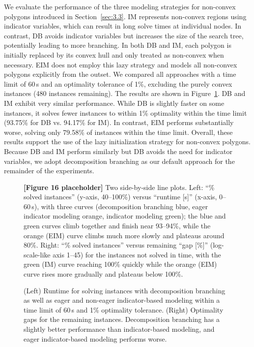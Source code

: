 \documentclass[11pt,a4paper]{article}
\theoremstyle{plain}
\begin{document}
We evaluate the performance of the three modeling strategies for non-convex polygons introduced in Section~\ref{sec:3.3}. IM represents non-convex regions using indicator variables, which can result in long solve times at individual nodes. In contrast, DB avoids indicator variables but increases the size of the search tree, potentially leading to more branching. In both DB and IM, each polygon is initially replaced by its convex hull and only treated as non-convex when necessary. EIM does not employ this lazy strategy and models all non-convex polygons explicitly from the outset. We compared all approaches with a time limit of 60\,s and an optimality tolerance of 1\%, excluding the purely convex instances (480 instances remaining). The results are shown in Figure~\ref{fig:16}. DB and IM exhibit very similar performance. While DB is slightly faster on some instances, it solves fewer instances to within 1\% optimality within the time limit (93.75\% for DB vs. 94.17\% for IM). In contrast, EIM performs substantially worse, solving only 79.58\% of instances within the time limit. Overall, these results support the use of the lazy initialization strategy for non-convex polygons. Because DB and IM perform similarly but DB avoids the need for indicator variables, we adopt decomposition branching as our default approach for the remainder of the experiments.

\begin{figure}[h]
\centering
\begin{figplaceholder}
\textbf{[Figure 16 placeholder]} Two side-by-side line plots. Left: ``\% solved instances'' (y-axis, 40--100\%) versus ``runtime [s]'' (x-axis, 0--60\,s), with three curves (decomposition branching blue, eager indicator modeling orange, indicator modeling green); the blue and green curves climb together and finish near 93--94\%, while the orange (EIM) curve climbs much more slowly and plateaus around 80\%. Right: ``\% solved instances'' versus remaining ``gap [\%]'' (log-scale-like axis 1--45) for the instances not solved in time, with the green (IM) curve reaching 100\% quickly while the orange (EIM) curve rises more gradually and plateaus below 100\%.
\end{figplaceholder}
\caption{(Left) Runtime for solving instances with decomposition branching as well as eager and non-eager indicator-based modeling within a time limit of 60\,s and 1\% optimality tolerance. (Right) Optimality gaps for the remaining instances. Decomposition branching has a slightly better performance than indicator-based modeling, and eager indicator-based modeling performs worse.}
\label{fig:16}
\end{figure}
\end{document}
